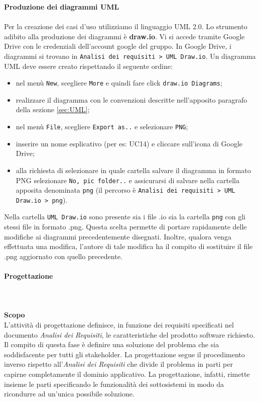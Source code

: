 			
			\noindent\textbf{Produzione dei diagrammi UML} \mbox{}\\ \mbox{}\\
			Per la creazione dei casi d'uso utilizziamo il linguaggio UML 2.0.
			Lo strumento adibito alla produzione dei diagrammi è \textbf{draw.io}.
			Vi si accede tramite Google Drive con le credenziali dell'account google del gruppo.
			In Google Drive, i diagrammi si trovano in \texttt{Analisi dei requisiti > UML Draw.io}.
			Un diagramma UML deve essere creato rispettando il seguente ordine:
			\begin{itemize}
				\item nel menù \texttt{New}, scegliere \texttt{More} e quindi fare
				click \texttt{draw.io Diagrams};
				\item realizzare il diagramma con le convenzioni descritte nell'apposito
				paragrafo della sezione \ref{sec:UML}; 
				\item nel menù \texttt{File}, scegliere \texttt{Export as..} e selezionare \texttt{PNG};
				\item inserire un nome esplicativo (per es: UC14) e cliccare sull'icona di
				Google Drive;
				\item alla richiesta di selezionare in quale cartella salvare il diagramma 
				in formato PNG selezionare \texttt{No, pic folder..} e assicurarsi di salvare 
				nella cartella apposita denominata \texttt{png} (il percorso è 
				\texttt{Analisi dei requisiti > UML Draw.io > png}).
			\end{itemize}
			Nella cartella \texttt{UML Draw.io} sono presente sia i file .io sia la cartella \texttt{png} con gli stessi file in formato .png.
			Questa scelta permette di portare rapidamente delle modifiche ai diagrammi precedentemente disegnati.
			Inoltre, qualora venga effettuata una modifica, l'autore di tale modifica ha il compito di sostituire il file .png aggiornato con quello precedente. 
					
		\paragraph{Progettazione} \mbox{}\\ \mbox{}\\
			\noindent\textbf{Scopo} \mbox{}\\
			
			\noindent L'attività di progettazione definisce, in funzione dei requisiti specificati 
			nel documento \textit{Analisi dei Requisiti}, le caratteristiche del prodotto 
			software richiesto. Il compito di questa fase è definire una soluzione del 
			problema che sia soddisfacente per tutti gli stakeholder. La progettazione segue 
			il procedimento inverso rispetto all'\textit{Analisi dei Requisiti} che divide 
			il problema in parti per capirne completamente il dominio applicativo. La 
			progettazione, infatti, rimette insieme le parti specificando le funzionalità 
			dei sottosistemi in modo da ricondurre ad un'unica possibile soluzione. \newline 
			
